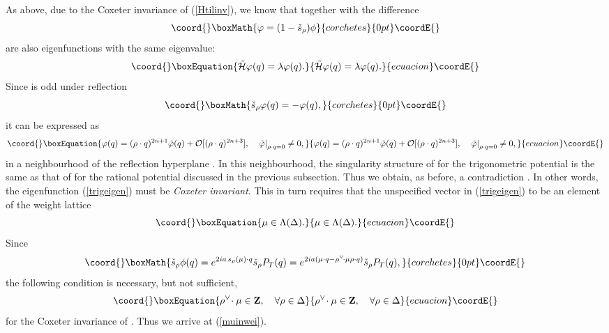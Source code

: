 \documentclass[a4paper,12pt]{article}
\begin{document}
As above, due to the Coxeter invariance of \coordHE{}
(\ref{Htilinv}),  we know that \coordHE{} together with
the difference
\[\coord{}\boxMath{
   \varphi=(1-\check{s}_{\rho})\phi
}{corchetes}{0pt}\coordE{}\]
are also eigenfunctions with the same
eigenvalue:
\begin{equation}\coord{}\boxEquation{
   \tilde{\cal H}\varphi(q)=\lambda \varphi(q).
   \label{phitileq}
}{
   \tilde{\cal H}\varphi(q)=\lambda \varphi(q).
   }{ecuacion}\coordE{}\end{equation}
Since \myHighlight{\(\varphi\)}\coordHE{}  is
odd under reflection \coordHE{}
\[\coord{}\boxMath{
   \check{s}_{\rho}\varphi(q)=-\varphi(q),
}{corchetes}{0pt}\coordE{}\]
it can be expressed as
\begin{equation}\coord{}\boxEquation{
   \varphi(q)=(\rho\cdot q)^{2n+1}\tilde{\varphi}(q)+{\cal O}[(\rho\cdot
   q)^{2n+3}],\quad
   \left.\tilde{\varphi}\right|_{\rho\cdot q=0}\neq0,
   \label{phitilfac}
}{
   \varphi(q)=(\rho\cdot q)^{2n+1}\tilde{\varphi}(q)+{\cal O}[(\rho\cdot
   q)^{2n+3}],\quad
   \left.\tilde{\varphi}\right|_{\rho\cdot q=0}\neq0,
   }{ecuacion}\coordE{}\end{equation}
in a neighbourhood of the reflection hyperplane \coordHE{}.
In this neighbourhood, the singularity structure of
\coordHE{} for the trigonometric potential is the same as
that of \coordHE{} for the rational potential discussed in
the previous subsection. Thus we obtain, as before, a contradiction
\coordHE{}.
In other words, the eigenfunction \myHighlight{\(\phi\)}\coordHE{} (\ref{trigeigen}) must
be {\em Coxeter invariant\/}.
This in turn requires that the unspecified vector \myHighlight{\(\mu\)}\coordHE{} in
(\ref{trigeigen}) to be an element of the weight lattice
\begin{equation}\coord{}\boxEquation{
   \mu\in\Lambda(\Delta).
   \label{muinwei}
}{
   \mu\in\Lambda(\Delta).
   }{ecuacion}\coordE{}\end{equation}
Since
\[\coord{}\boxMath{
   \check{s}_{\rho}\phi(q)=e^{2ia\, s_{\rho}(\mu)\cdot
   q}\check{s}_{\rho}P_T(q)=
   e^{2ia (\mu\cdot q-\rho^\vee\!\cdot\mu \rho\cdot
   q)}\check{s}_{\rho}P_T(q),
}{corchetes}{0pt}\coordE{}\]
the following condition is necessary, but not sufficient,
\begin{equation}\coord{}\boxEquation{
   \rho^\vee\!\cdot\mu\in{\bf Z},\quad \forall \rho\in\Delta
}{
   \rho^\vee\!\cdot\mu\in{\bf Z},\quad \forall \rho\in\Delta
}{ecuacion}\coordE{}\end{equation}
for the Coxeter invariance of \myHighlight{\(\phi\)}\coordHE{}. Thus we arrive at
(\ref{muinwei}).
\end{document}
